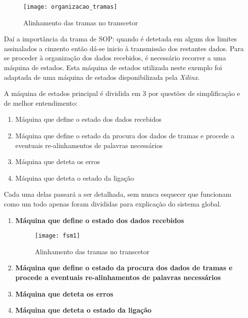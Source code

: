 \begin{figure}[h!]
		\begin{center}
		\leavevmode
		\texttt{[image: organizacao\_tramas]}
		\captionsetup{width=1.0\linewidth}
		\caption[Alinhamento das tramas no transcetor]{Alinhamento das tramas no transcetor}
		\label{fig:alinhamento_tramas_gtx}
	\end{center}
\end{figure}

Daí a importância da trama de SOP: quando é detetada em algum dos limites assinalados a cinzento então dá-se inicio à transmissão dos restantes dados. Para se proceder à organização dos dados recebidos, é necessário recorrer a uma máquina de estados. Esta máquina de estados utilizada neste exemplo foi adaptada de uma máquina de estados disponibilizada pela \textit{Xilinx}.

A máquina de estados principal é dividida em 3 por questões de simplificação e de melhor entendimento:
\begin{enumerate}
	\item Máquina que define o estado dos dados recebidos
	\item Máquina que define o estado da procura dos dados de tramas e procede a eventuais re-alinhamentos de palavras necessários
	\item Máquina que deteta os erros 
	\item Máquina que deteta o estado da ligação
\end{enumerate}

Cada uma delas passará a ser detalhada, sem nunca esquecer que funcionam como um todo apenas foram divididas para explicação do sistema global.

\begin{enumerate}
	\item \textbf{Máquina que define o estado dos dados recebidos}
	
	\begin{figure}[h!]
		\begin{center}
			\leavevmode
			\texttt{[image: fsm1]}
			\captionsetup{width=1.0\linewidth}
			\caption[Alinhamento das tramas no transcetor]{Alinhamento das tramas no transcetor}
			\label{fig:alinhamento_tramas_gtx}
		\end{center}
	\end{figure}
	
	
	\item \textbf{Máquina que define o estado da procura dos dados de tramas e procede a eventuais re-alinhamentos de palavras necessários}
	\item \textbf{Máquina que deteta os erros }
	\item \textbf{Máquina que deteta o estado da ligação}
\end{enumerate}

